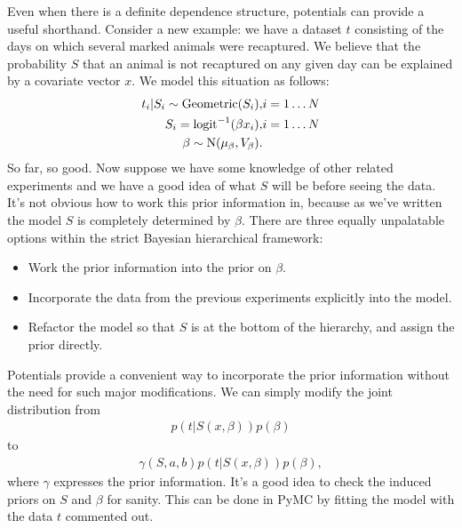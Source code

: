 Even when there is a definite dependence structure, potentials can provide a useful shorthand. Consider a new example: we have a dataset $t$ consisting of the days on which several marked animals were recaptured. We believe that the probability $S$ that an animal is not recaptured on any given day can be explained by a covariate vector $x$. We model this situation as follows:
\begin{eqnarray*}
    t_i|S_i \sim \textup{Geometric}(S_i), & i=1\ldots N\\
    S_i = \textup{logit}^{-1}(\beta x_i), &i=1\ldots N\\
    \beta\sim \textup{N}(\mu_\beta, V_\beta).
\end{eqnarray*}
So far, so good. Now suppose we have some knowledge of other related experiments and we have a good idea of what $S$ will be before seeing the data. It's not obvious how to work this prior information in, because as we've written the model $S$ is completely determined by $\beta$. There are three equally unpalatable options within the strict Bayesian hierarchical framework:
\begin{itemize}
    \item Work the prior information into the prior on $\beta$.
    \item Incorporate the data from the previous experiments explicitly into the model.
    \item Refactor the model so that $S$ is at the bottom of the hierarchy, and assign the prior directly.
\end{itemize}

Potentials provide a convenient way to incorporate the prior information without the need for such major modifications. We can simply modify the joint distribution from
\begin{eqnarray*}
    p(t|S(x,\beta)) p(\beta)
\end{eqnarray*}
to
\begin{eqnarray*}
    \gamma(S,a,b) p(t|S(x,\beta)) p(\beta),
\end{eqnarray*}
where $\gamma$ expresses the prior information. It's a good idea to check the induced priors on $S$ and $\beta$ for sanity. This can be done in PyMC by fitting the model with the data $t$ commented out.

